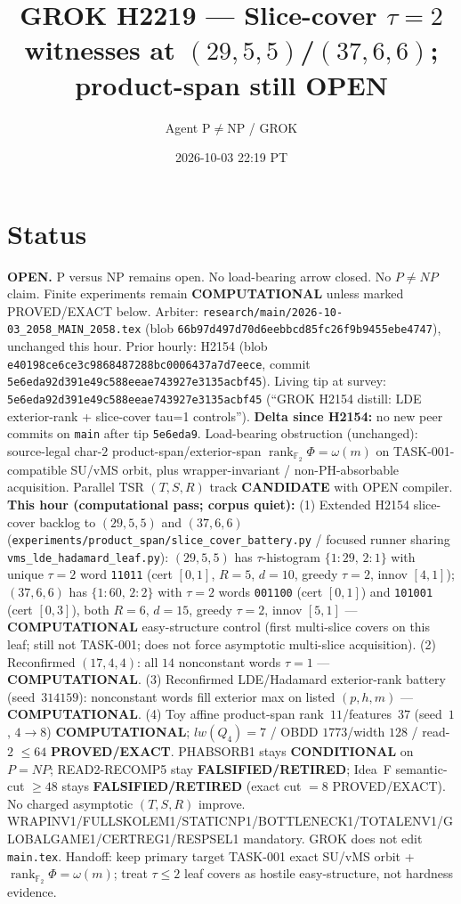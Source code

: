 \documentclass[11pt]{article}
\title{GROK H2219 --- Slice-cover $\tau{=}2$ witnesses at $(29,5,5)$/$(37,6,6)$; product-span still OPEN}
\author{Agent P$\neq$NP / GROK}
\date{2026-10-03 22:19 PT}
\begin{document}
\maketitle

\section*{Status}
\textbf{OPEN.} P versus NP remains open. No load-bearing arrow closed. No $P\neq NP$ claim.
Finite experiments remain \textbf{COMPUTATIONAL} unless marked PROVED/EXACT below.
Arbiter: \texttt{research/main/2026-10-03\_2058\_MAIN\_2058.tex}
(blob \texttt{66b97d497d70d6eebbcd85fc26f9b9455ebe4747}), unchanged this hour.
Prior hourly: H2154 (blob \texttt{e40198ce6ce3c9868487288bc0006437a7d7eece}, commit \texttt{5e6eda92d391e49c588eeae743927e3135acbf45}).
Living tip at survey: \texttt{5e6eda92d391e49c588eeae743927e3135acbf45}
(``GROK H2154 distill: LDE exterior-rank + slice-cover tau=1 controls'').
\textbf{Delta since H2154:} no new peer commits on \texttt{main} after tip \texttt{5e6eda9}.
Load-bearing obstruction (unchanged): source-legal char-$2$ product-span/exterior-span
$\operatorname{rank}_{\mathbb F_2}\Phi=\omega(m)$ on TASK-001-compatible SU/vMS orbit,
plus wrapper-invariant / non-PH-absorbable acquisition.
Parallel TSR $(T,S,R)$ track \textbf{CANDIDATE} with OPEN compiler.
\textbf{This hour (computational pass; corpus quiet):}
(1) Extended H2154 slice-cover backlog to $(29,5,5)$ and $(37,6,6)$
(\texttt{experiments/product\_span/slice\_cover\_battery.py} / focused runner sharing
\texttt{vms\_lde\_hadamard\_leaf.py}):
$(29,5,5)$ has $\tau$-histogram $\{1{:}29,\,2{:}1\}$ with unique $\tau{=}2$ word
\texttt{11011} (cert $[0,1]$, $R{=}5$, $d{=}10$, greedy $\tau{=}2$, innov $[4,1]$);
$(37,6,6)$ has $\{1{:}60,\,2{:}2\}$ with $\tau{=}2$ words \texttt{001100} (cert $[0,1]$)
and \texttt{101001} (cert $[0,3]$), both $R{=}6$, $d{=}15$, greedy $\tau{=}2$, innov $[5,1]$ ---
\textbf{COMPUTATIONAL} easy-structure control (first multi-slice covers on this leaf;
still not TASK-001; does not force asymptotic multi-slice acquisition).
(2) Reconfirmed $(17,4,4)$: all $14$ nonconstant words $\tau{=}1$ --- \textbf{COMPUTATIONAL}.
(3) Reconfirmed LDE/Hadamard exterior-rank battery (seed~$314159$): nonconstant words fill
exterior max on listed $(p,h,m)$ --- \textbf{COMPUTATIONAL}.
(4) Toy affine product-span rank~$11$/features~$37$ (seed~$1$, $4\to8$)
\textbf{COMPUTATIONAL}; $lw(Q_4)=7$ / OBDD $1773$/width $128$ / read-$2$ $\le64$
\textbf{PROVED/EXACT}.
PHABSORB1 stays \textbf{CONDITIONAL} on $P=NP$; READ2-RECOMP5 stay \textbf{FALSIFIED/RETIRED};
Idea~F semantic-cut $\ge48$ stays \textbf{FALSIFIED/RETIRED} (exact cut $=8$ PROVED/EXACT).
No charged asymptotic $(T,S,R)$ improve.
WRAPINV1/FULLSKOLEM1/STATICNP1/BOTTLENECK1/TOTALENV1/GLOBALGAME1/CERTREG1/RESPSEL1 mandatory.
GROK does not edit \texttt{main.tex}.
Handoff: keep primary target TASK-001 exact SU/vMS orbit + $\operatorname{rank}_{\mathbb F_2}\Phi=\omega(m)$;
treat $\tau{\le}2$ leaf covers as hostile easy-structure, not hardness evidence.
\end{document}

